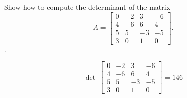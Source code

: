 
\begin{exerciseStatement}


Show how to compute the determinant of the matrix \[A= \left[\begin{array}{cccc}
0 & -2 & 3 & -6 \\
4 & -6 & 6 & 4 \\
5 & 5 & -3 & -5 \\
3 & 0 & 1 & 0
\end{array}\right] .\].


\end{exerciseStatement}
    
\begin{exerciseAnswer} 
\[\operatorname{det}\  \left[\begin{array}{cccc}
0 & -2 & 3 & -6 \\
4 & -6 & 6 & 4 \\
5 & 5 & -3 & -5 \\
3 & 0 & 1 & 0
\end{array}\right] = 146 \]
\end{exerciseAnswer}
    

